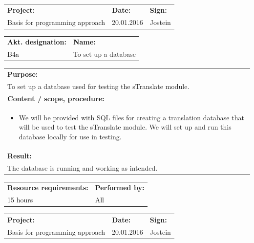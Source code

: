 \documentclass[12pt, a4paper]{article}
\begin{document}
\newpage

\begin{tabularx}{\textwidth}{|X|p{32mm}|p{20mm}|}
	\hline
	\textbf{Project:}&\textbf{Date:}&\textbf{Sign:}\\
	Basis for programming approach&20.01.2016&Jostein\\
	\hline
\end{tabularx}

\begin{tabularx}{\textwidth}{|p{40mm}|X|}
	\textbf{Akt. designation:}&\textbf{Name:}\\
	B4a&To set up a database \\
	\hline
\end{tabularx}

\begin{tabularx}{\textwidth}{|X|}
	\textbf{Purpose:}\\
	To set up a database used for testing the sTranslate module.\\
	\hline
	\textbf{Content / scope, procedure:}\\
	\begin{itemize}
		\item We will be provided with SQL files for creating a translation database that will be used to test the sTranslate module. We will set up and run this database locally for use in testing.
	\end{itemize} \\
 	\hline
	\textbf{Result:}\\
	The database is running and working as intended. \\
	\hline
\end{tabularx}

\begin{tabularx}{\textwidth}{|X|p{30mm}|}
	\textbf{Resource requirements:}&\textbf{Performed by:}\\
	15 hours&All\\
	\hline
\end{tabularx}

\newpage

\begin{tabularx}{\textwidth}{|X|p{32mm}|p{20mm}|}
	\hline
	\textbf{Project:}&\textbf{Date:}&\textbf{Sign:}\\
	Basis for programming approach&20.01.2016&Jostein\\
	\hline
\end{tabularx}
\end{document}
